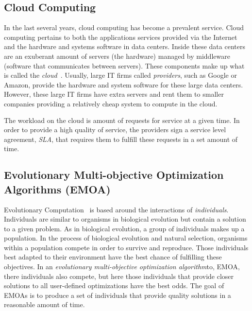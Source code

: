 \documentclass{sig-alternate}
\begin{document}
\subsection{Cloud Computing}
\label{sec:Cloud Computing}

In the last several years, cloud computing has become a prevalent service. Cloud computing pertains to both the applications services provided via the Internet and the hardware and systems software in data centers. Inside these data centers are an exuberant amount of servers (the hardware) managed by middleware (software that communicates between servers). These components make up what is called the \emph{cloud}~\cite{Armbrust}. Usually, large IT firms called \emph{providers}, such as Google or Amazon, provide the hardware and system software for these large data centers. However, these large IT firms have extra servers and rent them to smaller companies providing a relatively cheap system to compute in the cloud. 

The workload on the cloud is amount of requests for service at a given time. In order to provide a high quality of service, the providers sign a service level agreement, \emph{SLA}, that requires them to fulfill these requests in a set amount of time. 

\subsection{Evolutionary Multi-objective Optimization Algorithms (EMOA)}
\label{sec:EMOA}

Evolutionary Computation~\cite{poli08:fieldguide} is based around the interactions of \emph{individuals}. Individuals are similar to organisms in biological evolution but contain a solution to a given problem. As in biological evolution, a group of individuals makes up a population. In the process of biological evolution and natural selection, organisms within a population compete in order to survive and reproduce. Those individuals best adapted to their environment have the best chance of fulfilling these objectives.  In an \emph{evolutionary multi-objective optimization algorithm}to, EMOA, there individuals also compete, but here those individuals that provide closer solutions to all user-defined optimizations have the best odds. The goal of EMOAs is to produce a set of individuals that provide quality solutions in a reasonable amount of time. 
\end{document}
